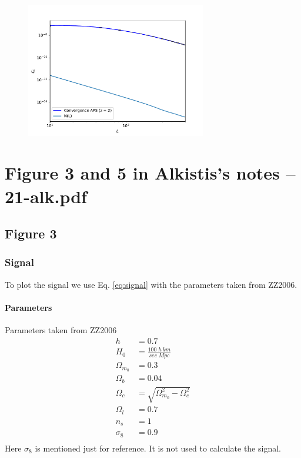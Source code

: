 \documentclass[12pt]{article}
\numberwithin{equation}{section}
\begin{document}
\begin{figure}
	\centering
	\includegraphics[width=0.7\textwidth]{full_plot_j_max_1_lmax_1000}
\end{figure}


\section{Figure 3 and 5 in Alkistis's notes -- 21-alk.pdf}
\subsection{Figure 3}
\subsubsection{Signal}
To plot the signal we use Eq. \ref{eq:signal} with the parameters taken from ZZ2006.

\paragraph{Parameters}
Parameters taken from ZZ2006
\begin{align}
h & = 0.7 \\
H_0 &= \frac{100\;h\,km}{sec\;Mpc}\\
\Omega_{m_0} &= 0.3 \\
\Omega_{b} &= 0.04 \\
\Omega_{c} &= \sqrt{\Omega_{m_0}^2 - \Omega_{c}^2}\\
\Omega_{l} &= 0.7\\
n_s &= 1\\
\sigma_8 &= 0.9\\
\end{align}
Here $\sigma_8$ is mentioned just for reference. It is not used to calculate the signal.
\end{document}
